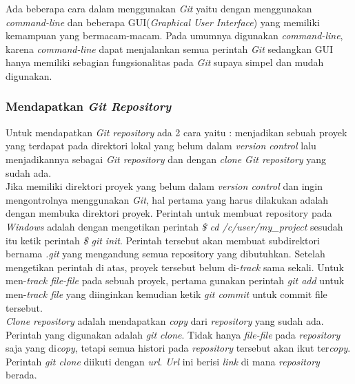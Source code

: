 Ada beberapa cara dalam menggunakan \textit{Git} yaitu dengan menggunakan \textit{command-line} dan beberapa GUI(\textit{Graphical User Interface}) yang memiliki kemampuan yang bermacam-macam. Pada umumnya digunakan \textit{command-line}, karena \textit{command-line} dapat menjalankan semua perintah \textit{Git} sedangkan GUI hanya memiliki sebagian fungsionalitas pada \textit{Git} supaya simpel dan mudah digunakan. 

\subsubsection{Mendapatkan \textit{Git Repository}}
Untuk mendapatkan \textit{Git repository} ada 2 cara yaitu : menjadikan sebuah proyek yang terdapat pada direktori lokal yang belum dalam \textit{version control} lalu menjadikannya sebagai \textit{Git repository} dan dengan \textit{clone Git repository} yang sudah ada.\\

Jika memiliki direktori proyek yang belum dalam \textit{version control} dan ingin mengontrolnya menggunakan \textit{Git}, hal pertama yang harus dilakukan adalah dengan membuka direktori proyek. Perintah untuk membuat repository pada \textit{Windows} adalah dengan mengetikan perintah \textit{\$ cd /c/user/my\_project} sesudah itu ketik perintah \textit{\$ git init}. Perintah tersebut akan membuat subdirektori bernama \textit{.git} yang mengandung semua repository yang dibutuhkan. Setelah mengetikan perintah di atas, proyek tersebut belum di-\textit{track} sama sekali. Untuk men-\textit{track file-file} pada sebuah proyek, pertama gunakan perintah \textit{git add} untuk men-\textit{track file} yang diinginkan kemudian ketik \textit{git commit} untuk commit file tersebut.\\

\textit{Clone repository} adalah mendapatkan \textit{copy} dari \textit{repository} yang sudah ada. Perintah yang digunakan adalah \textit{git clone}. Tidak hanya \textit{file-file} pada \textit{repository} saja yang di\textit{copy}, tetapi semua histori pada \textit{repository} tersebut akan ikut ter\textit{copy}. Perintah \textit{git clone} diikuti dengan \textit{url}. \textit{Url} ini berisi \textit{link} di mana \textit{repository} berada.

